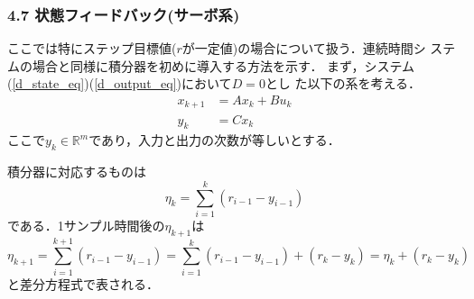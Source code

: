 \begin{frame}[t]
\frametitle{4.7 状態フィードバック(サーボ系)}
ここでは特にステップ目標値($r$が一定値)の場合について扱う．連続時間シ
ステムの場合と同様に積分器を初めに導入する方法を示す．
まず，システム(\ref{d_state_eq})(\ref{d_output_eq})において$D=0$とし
た以下の系を考える．
\begin{align}
   x_{k+1} &= A x_k + B u_k \label{d_st_proper_state_eq} \\
       y_k &= C x_k
\label{d_st_proper_output_eq}
\end{align}
ここで$y_k \in \mathbb{R}^m$であり，入力と出力の次数が等しいとする．

積分器に対応するものは
\begin{equation}
 \eta_{k} = \sum_{i=1}^{k} (r_{i-1}-y_{i-1}) 
\end{equation}
である．1サンプル時間後の$\eta_{k+1}$は
\begin{equation}
 \eta_{k+1} = \sum_{i=1}^{k+1} (r_{i-1}-y_{i-1}) 
   = \sum_{i=1}^{k} (r_{i-1}-y_{i-1}) + (r_k-y_k) = \eta_k + (r_k - y_k) 
\end{equation}
と差分方程式で表される．
\end{frame}


